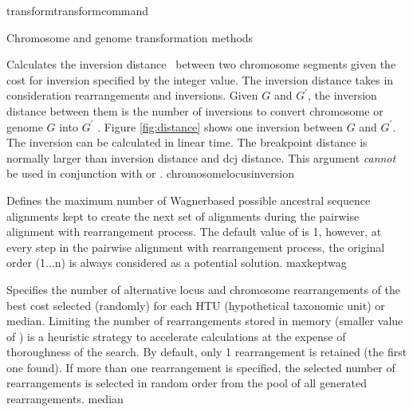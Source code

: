 \begin{command}{transform}{transformcommand}
\begin{arguments}
\begin{argumentgroup}{Chromosome and genome transformation methods}
\begin{description}
                    {Calculates the inversion distance~\cite{hanenhalliandpevzner1995}
                    between two chromosome segments given the cost for inversion
                    specified by the integer value. The inversion distance
                    takes in consideration rearrangements and
                    inversions. Given $G$ and $G^\prime$, the inversion distance between
                    them is the number of inversions to convert chromosome or genome $G$ 
                    into $G^\prime$ \cite{hanenhalliandpevzner1995}. Figure \ref{fig:distance} shows one inversion  
                    between $G$ and $G^\prime$. The inversion can be calculated in linear time.
                    The breakpoint distance is normally larger than
                    inversion distance  and dcj distance.
                    This argument \emph{cannot} be used in conjunction with
                     or .} 
                    {chromosomelocusinversion}  
                    
                    {Defines the maximum number of Wagner\-based possible ancestral sequence
                    alignments kept to create the next set of alignments during the pairwise alignment
                    with rearrangement process.  The default value of  is 1,
                    however, at every step in the pairwise alignment with rearrangement process, the original
                    order (1...n) is always considered as a potential solution.}
                    {maxkeptwag}
       		      
                    {Specifies the number of alternative locus and chromosome
                    rearrangements of the best cost selected (randomly) for
                    each HTU (hypothetical taxonomic unit) or median. Limiting the number of rearrangements
                    stored in memory (smaller value of )
                    is a heuristic strategy to accelerate calculations at the
                    expense of thoroughness of the search. By default, only 1
                    rearrangement is retained (the first one found). If more than
                    one rearrangement is specified, the selected number of
                    rearrangements is selected in random order from the pool of
                    all generated rearrangements.}
                    {median}


\end{description}
\end{argumentgroup}
\end{arguments}
\end{command}

